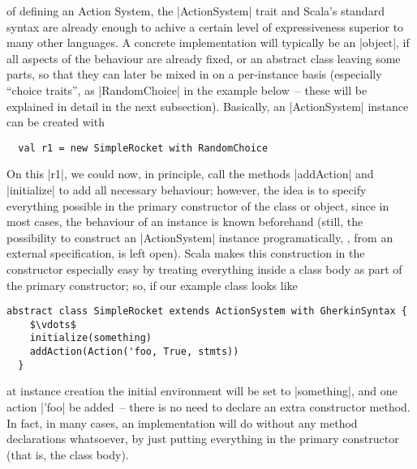  of defining an Action System, the |ActionSystem| trait and
Scala's standard syntax are already enough to achive a certain level of expressiveness superior to
many other languages. A concrete implementation will typically be an |object|, if all aspects of the
behaviour are already fixed, or an abstract class leaving some parts, so that they can later be
mixed in on a per-instance basis (especially \enquote{choice traits}, as |RandomChoice| in the
example below~-- these will be explained in detail in the next subsection). Basically, an
|ActionSystem| instance can be created with \eg
\begin{lstlisting}
  val r1 = new SimpleRocket with RandomChoice
\end{lstlisting}
On this |r1|, we could now, in principle, call the methods |addAction| and |initialize| to add all
necessary behaviour; however, the idea is to specify everything possible in the primary constructor
of the class or object, since in most cases, the behaviour of an instance is known beforehand
(still, the possibility to construct an |ActionSystem| instance programatically, \eg, from an
external specification, is left open). Scala makes this construction in the constructor especially
easy by treating everything inside a class body as part of the primary constructor; so, if our
example class looks like
\begin{lstlisting}[mathescape]
  abstract class SimpleRocket extends ActionSystem with GherkinSyntax {
    $\vdots$
    initialize(something)
    addAction(Action('foo, True, stmts))
  }
\end{lstlisting}
at instance creation the initial environment will be set to |something|, and one action |'foo| be
added~-- there is no need to declare an extra constructor method. In fact, in many cases, an
implementation will do without any method declarations whatsoever, by just putting everything in the
primary constructor (that is, the class body).

